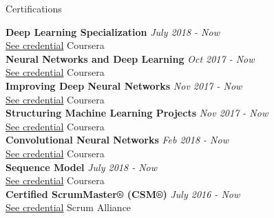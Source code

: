 \documentclass{resume} %
\begin{document}
\begin{rSection}{Certifications}

{\bf Deep Learning Specialization} \hfill {\em July 2018 - Now } 
\\ \href{https://www.coursera.org/account/accomplishments/specialization/TLSQP268HYTN}{See credential}\hfill { Coursera }
\\
{\bf Neural Networks and Deep Learning} \hfill {\em Oct 2017 - Now } 
\\ \href{https://www.coursera.org/account/accomplishments/verify/ZX6HNLJLTC78}{See credential}\hfill { Coursera }
\\
{\bf Improving Deep Neural Networks} \hfill {\em Nov 2017 - Now } 
\\ \href{https://www.coursera.org/account/accomplishments/verify/ED7FGSZ9FQWT}{See credential}\hfill { Coursera }
\\
{\bf Structuring Machine Learning Projects} \hfill {\em Nov 2017 - Now } 
\\ \href{https://www.coursera.org/account/accomplishments/verify/24FF824Y2JN2}{See credential}\hfill { Coursera }
\\
{\bf Convolutional Neural Networks} \hfill {\em Feb 2018 - Now } 
\\ \href{https://www.coursera.org/account/accomplishments/verify/SQVKAE5M6UT5}{See credential}\hfill { Coursera }
\\
{\bf Sequence Model} \hfill {\em July 2018 - Now } 
\\ \href{https://www.coursera.org/account/accomplishments/verify/3GKGQZN97W83}{See credential}\hfill { Coursera }
\\
{\bf Certified ScrumMaster® (CSM®)} \hfill {\em July 2016 - Now } 
\\ \href{http://bcert.me/sufosajdm}{See credential}\hfill { Scrum Alliance }

\end{rSection}

\end{document}
